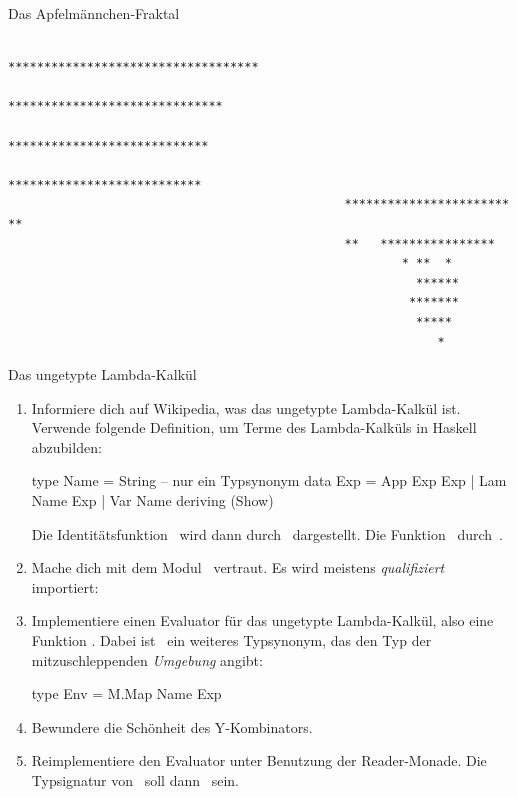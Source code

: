 \documentclass{uebblatt}
\begin{document}
\begin{aufgabe}{Das Apfelmännchen-Fraktal}
\begin{tiny}
\begin{verbatim}
                                          ***********************************
                                            ******************************
                                             ****************************
                                               ***************************
                                               ***********************  **
                                               **   ****************
                                                       * **  *
                                                         ******
                                                        *******
                                                         *****
                                                            *
\end{verbatim}\end{tiny}
\end{aufgabe}

\begin{aufgabe}{Das ungetypte Lambda-Kalkül}
\begin{enumerate}
\item Informiere dich auf Wikipedia, was das ungetypte Lambda-Kalkül ist.
Verwende folgende Definition, um Terme des Lambda-Kalküls in Haskell
abzubilden:
\begin{haskellcode}
type Name = String  -- nur ein Typsynonym
data Exp
    = App Exp  Exp
    | Lam Name Exp
    | Var Name
    deriving (Show)
\end{haskellcode}
Die Identitätsfunktion~ wird dann
durch~ dargestellt. Die
Funktion~ durch~.
\item Mache dich mit dem Modul~ vertraut. Es wird
meistens \emph{qualifiziert} importiert: 
\item Implementiere einen Evaluator für das ungetypte Lambda-Kalkül, also eine
Funktion . Dabei
ist~ ein weiteres Typsynonym, das den Typ der
mitzuschleppenden \emph{Umgebung} angibt:
\begin{haskellcode}
type Env = M.Map Name Exp
\end{haskellcode}
\item Bewundere die Schönheit des Y-Kombinators.
\item Reimplementiere den Evaluator unter Benutzung der Reader-Monade. Die
Typsignatur von~ soll dann~ sein.
\end{enumerate}
\end{aufgabe}
\end{document}
